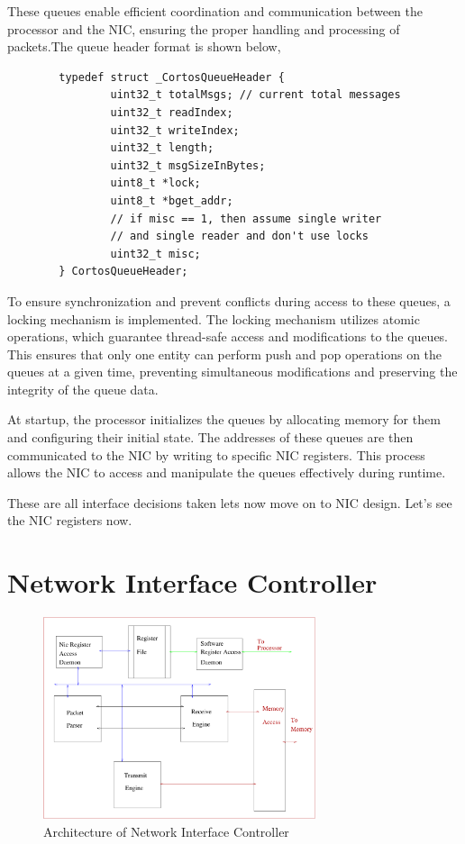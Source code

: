 \documentclass[12pt]{report}
\begin{document}
These queues enable efficient coordination and communication between the processor and the NIC, ensuring the proper handling and processing of packets.The queue header format is shown below,
		\begin{verbatim}
		typedef struct _CortosQueueHeader {
		        uint32_t totalMsgs; // current total messages
		        uint32_t readIndex;
		        uint32_t writeIndex;
		        uint32_t length;
		        uint32_t msgSizeInBytes;
		        uint8_t *lock;
		        uint8_t *bget_addr;
		        // if misc == 1, then assume single writer 
		        // and single reader and don't use locks
		        uint32_t misc;
		} CortosQueueHeader;
		\end{verbatim}
	

To ensure synchronization and prevent conflicts during access to these queues, a locking mechanism is implemented. The locking mechanism utilizes atomic operations, which guarantee thread-safe access and modifications to the queues. This ensures that only one entity can perform push and pop operations on the queues at a given time, preventing simultaneous modifications and preserving the integrity of the queue data.


At startup, the processor initializes the queues by allocating memory for them and configuring their initial state. The addresses of these queues are then communicated to the NIC by writing to specific NIC registers. This process allows the NIC to access and manipulate the queues effectively during runtime. 

		These are all interface decisions taken lets now move on to NIC design. Let's see the NIC registers now.

	\section{Network Interface Controller}
		

		\begin{figure}[h!]
			\centering
			\includegraphics[width=8cm]{./figures/NIC_Internal.pdf}
			\caption{Architecture of Network Interface Controller}
			\label{fig:NIC-Arch}
		\end{figure}
\end{document}
